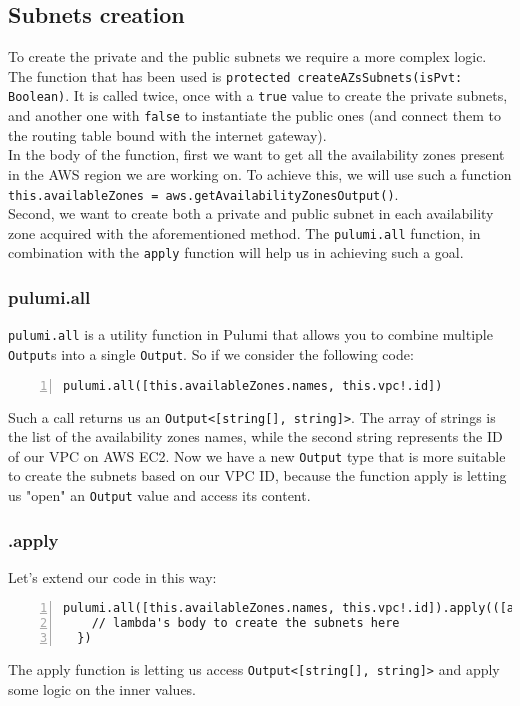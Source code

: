 \subsection{Subnets creation}
To create the private and the public subnets we require a more complex logic.
The function that has been used is \texttt{protected createAZsSubnets(isPvt: Boolean)}.
It is called twice, once with a \texttt{true} value to create the private subnets, and another one with \texttt{false} to instantiate the public ones (and connect them to the routing table bound with the internet gateway).\\
In the body of the function, first we want to get all the availability zones present in the AWS region we are working on.
To achieve this, we will use such a function \texttt{this.availableZones = aws.getAvailabilityZonesOutput()}.\\
Second, we want to create both a private and public subnet in each availability zone acquired with the aforementioned method.
The \texttt{pulumi.all} function, in combination with the \texttt{apply} function will help us in achieving such a goal.\\

\subsubsection{pulumi.all}
\label{sssec:pulumi-all}
\texttt{pulumi.all} is a utility function in Pulumi that allows you to combine multiple \texttt{Output}s into a single \texttt{Output}.
So if we consider the following code:\\
\begin{minipage}{\linewidth}
\begin{lstlisting}[numbers=left, numberstyle=\tiny, numbersep=-5pt, stepnumber=1]
  pulumi.all([this.availableZones.names, this.vpc!.id])
\end{lstlisting}
\end{minipage}
Such a call returns us an \texttt{Output<[string[], string]>}.
The array of strings is the list of the availability zones names, while the second string represents the ID of our VPC on AWS EC2.
Now we have a new \texttt{Output} type that is more suitable to create the subnets based on our VPC ID, because the function apply is letting us "open" an \texttt{Output} value and access its content.

\subsubsection{.apply}
Let's extend our code in this way:\\
\begin{minipage}{\linewidth}
\begin{lstlisting}[numbers=left, numberstyle=\tiny, numbersep=-5pt, stepnumber=1]
  pulumi.all([this.availableZones.names, this.vpc!.id]).apply(([azNames, vpcId]) => {
    // lambda's body to create the subnets here
  })
\end{lstlisting}
\end{minipage}
The apply function is letting us access \texttt{Output<[string[], string]>} and apply some logic on the inner values.\\

